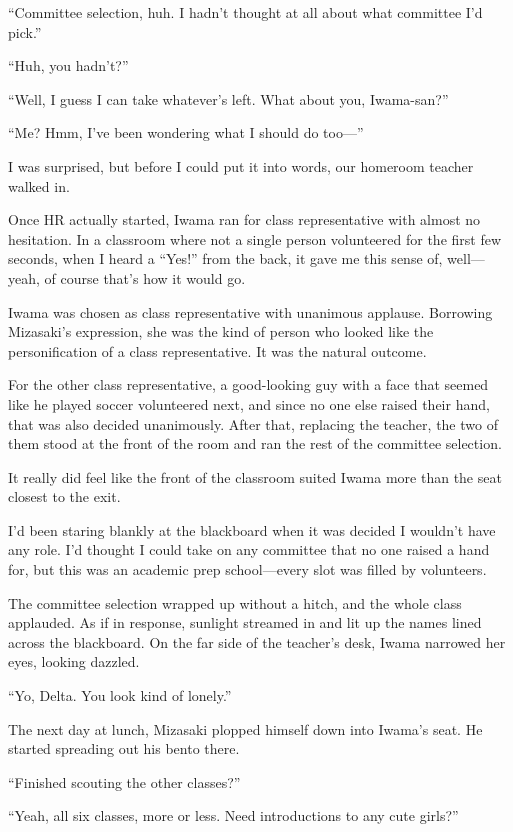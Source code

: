 \documentclass[
    a4paper,
    12pt,
    twoside,
    openany,
    UTF8,
    fontset=windows
]{ctexbook}
\begin{document}
``Committee selection, huh. I hadn't thought at all about what committee I'd pick.''

``Huh, you hadn't?''

``Well, I guess I can take whatever's left. What about you, Iwama-san?''

``Me? Hmm, I've been wondering what I should do too---''

I was surprised, but before I could put it into words, our homeroom teacher walked in.

Once HR actually started, Iwama ran for class representative with almost no hesitation. In a classroom where not a single person volunteered for the first few seconds, when I heard a ``Yes!'' from the back, it gave me this sense of, well---yeah, of course that's how it would go.

Iwama was chosen as class representative with unanimous applause. Borrowing Mizasaki's expression, she was the kind of person who looked like the personification of a class representative. It was the natural outcome.

For the other class representative, a good-looking guy with a face that seemed like he played soccer volunteered next, and since no one else raised their hand, that was also decided unanimously. After that, replacing the teacher, the two of them stood at the front of the room and ran the rest of the committee selection.

It really did feel like the front of the classroom suited Iwama more than the seat closest to the exit.

I'd been staring blankly at the blackboard when it was decided I wouldn't have any role. I'd thought I could take on any committee that no one raised a hand for, but this was an academic prep school---every slot was filled by volunteers.

The committee selection wrapped up without a hitch, and the whole class applauded. As if in response, sunlight streamed in and lit up the names lined across the blackboard. On the far side of the teacher's desk, Iwama narrowed her eyes, looking dazzled.

``Yo, Delta. You look kind of lonely.''

The next day at lunch, Mizasaki plopped himself down into Iwama's seat. He started spreading out his bento there.

``Finished scouting the other classes?''

``Yeah, all six classes, more or less. Need introductions to any cute girls?''
\end{document}
